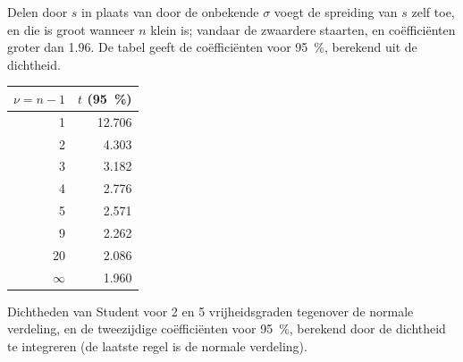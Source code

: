 \admitted

Delen door $s$ in plaats van door de onbekende $\sigma$ voegt de spreiding van $s$ zelf toe, en die is groot wanneer $n$
klein is; vandaar de zwaardere staarten, en coëfficiënten groter dan 1.96. De tabel geeft de coëfficiënten voor 95~\%,
berekend uit de dichtheid.

\begin{omfigure}
\begin{minipage}[c]{0.56\linewidth}
\end{minipage}\hfill
\begin{minipage}[c]{0.4\linewidth}\centering
\small
\begin{tabular}{rr}
\hline
$\nu = n - 1$ & $t$ (95~\%) \\
\hline
1 & 12.706 \\
2 & 4.303 \\
3 & 3.182 \\
4 & 2.776 \\
5 & 2.571 \\
9 & 2.262 \\
20 & 2.086 \\
$\infty$ & 1.960 \\
\hline
\end{tabular}
\end{minipage}
\par\vspace{4pt}

{\small Dichtheden van Student voor 2 en 5 vrijheidsgraden tegenover de normale verdeling, en de tweezijdige
coëfficiënten voor 95~\%, berekend door de dichtheid te integreren (de laatste regel is de normale verdeling).}
\end{omfigure}

